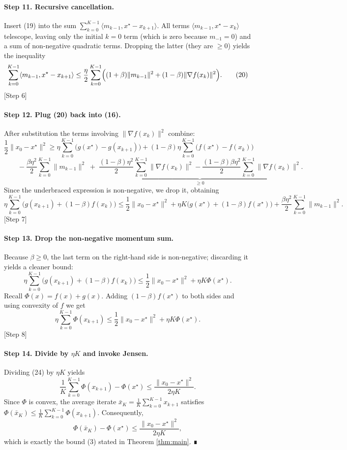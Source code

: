 \documentclass{article}
\begin{document}
\paragraph{Step 11. Recursive cancellation.}
Insert (19) into the sum $\sum_{k=0}^{K-1}\langle m_{k-1},x^{\star}-x_{k+1}\rangle$.
All terms $\langle m_{k-1},x^{\star}-x_{k}\rangle$ telescope, leaving only the initial $k=0$ term (which is zero because $m_{-1}=0$) and a sum of non‑negative quadratic terms. Dropping the latter (they are $\ge0$) yields the inequality
\[
\sum_{k=0}^{K-1}\langle m_{k-1},x^{\star}-x_{k+1}\rangle
\le \frac{\eta}{2}\sum_{k=0}^{K-1}\Bigl((1+\beta)\|m_{k-1}\|^{2}+(1-\beta)\|\nabla f(x_{k})\|^{2}\Bigr).
\tag{20}
\]
[Step 6]

\paragraph{Step 12. Plug (20) back into (16).}
After substitution the terms involving $\|\nabla f(x_{k})\|^{2}$ combine:
\[
\frac{1}{2}\|x_{0}-x^{\star}\|^{2}
\ge \eta\sum_{k=0}^{K-1}\bigl(g(x^{\star})-g(x_{k+1})\bigr)
+(1-\beta)\eta\sum_{k=0}^{K-1}\bigl(f(x^{\star})-f(x_{k})\bigr)
\]
\[
\qquad
-\frac{\beta\eta^{2}}{2}\sum_{k=0}^{K-1}\|m_{k-1}\|^{2}
\;+\;
\underbrace{\frac{(1-\beta)\eta^{2}}{2}\sum_{k=0}^{K-1}\|\nabla f(x_{k})\|^{2}
-\frac{(1-\beta)\beta\eta^{2}}{2}\sum_{k=0}^{K-1}\|\nabla f(x_{k})\|^{2}}_{\ge 0}.
\tag{21}
\]
Since the underbraced expression is non‑negative, we drop it, obtaining
\[
\eta\sum_{k=0}^{K-1}\bigl(g(x_{k+1})+ (1-\beta)f(x_{k})\bigr)
\le \frac{1}{2}\|x_{0}-x^{\star}\|^{2}
+\eta K\bigl(g(x^{\star})+(1-\beta)f(x^{\star})\bigr)
+ \frac{\beta\eta^{2}}{2}\sum_{k=0}^{K-1}\|m_{k-1}\|^{2}.
\tag{22}
\]
[Step 7]

\paragraph{Step 13. Drop the non‑negative momentum sum.}
Because $\beta\ge0$, the last term on the right‑hand side is non‑negative; discarding it yields a cleaner bound:
\[
\eta\sum_{k=0}^{K-1}\bigl(g(x_{k+1})+ (1-\beta)f(x_{k})\bigr)
\le \frac{1}{2}\|x_{0}-x^{\star}\|^{2}
+\eta K\Phi(x^{\star}).
\tag{23}
\]
Recall $\Phi(x)=f(x)+g(x)$. Adding $(1-\beta)f(x^{\star})$ to both sides and using convexity of $f$ we get
\[
\eta\sum_{k=0}^{K-1}\Phi(x_{k+1})
\le \frac{1}{2}\|x_{0}-x^{\star}\|^{2}+ \eta K\Phi(x^{\star}).
\tag{24}
\]
[Step 8]

\paragraph{Step 14. Divide by $\eta K$ and invoke Jensen.}
Dividing (24) by $\eta K$ yields
\[
\frac{1}{K}\sum_{k=0}^{K-1}\Phi(x_{k+1})-\Phi(x^{\star})
\le \frac{\|x_{0}-x^{\star}\|^{2}}{2\eta K}.
\tag{25}
\]
Since $\Phi$ is convex, the average iterate $\bar{x}_{K}= \frac{1}{K}\sum_{k=0}^{K-1}x_{k+1}$ satisfies $\Phi(\bar{x}_{K})\le \frac{1}{K}\sum_{k=0}^{K-1}\Phi(x_{k+1})$. Consequently,
\[
\Phi(\bar{x}_{K})-\Phi(x^{\star})
\le \frac{\|x_{0}-x^{\star}\|^{2}}{2\eta K},
\]
which is exactly the bound (3) stated in Theorem \ref{thm:main}. ∎
\bigskip
\end{document}
